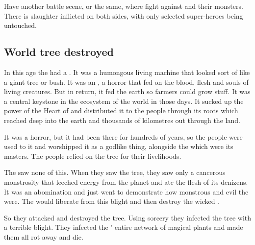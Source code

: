 
Have another battle scene, or the same, where \dragons{} fight against \banes{} and their monsters. There is slaughter inflicted on both sides, with only selected super-heroes being untouched. 










\subsection{World tree destroyed}
In this age the \dragons had a . 
It was a humongous living machine that looked sort of like a giant tree or bush. 
It was an , a horror that fed on the blood, flesh and souls of living creatures. 
But in return, it fed the earth so farmers could grow stuff. 
It was a central keystone in the ecosystem of the world in those days. 
It sucked up the power of the Heart of \Miith and distributed it to the people through its roots which reached deep into the earth and thousands of kilometres out through the land. 

It was a horror, but it had been there for hundreds of years, so the people were used to it and worshipped it as a godlike thing, alongside the \dragons which were its masters. 
The people relied on the tree for their livelihoods. 

The \resphain saw none of this. 
When they saw the tree, they saw only a cancerous monstrosity that leeched energy from the planet and ate the flesh of its denizens. 
It was an abomination and just went to demonstrate how monstrous and evil the \dragons were. 
The \resphain would liberate \Miith from this blight and then destroy the wicked \dragons. 

So they attacked and destroyed the tree. 
Using \SitraAchra sorcery they infected the tree with a terrible blight. 
They infected the \dragons' entire network of magical plants and made them all rot away and die. 

